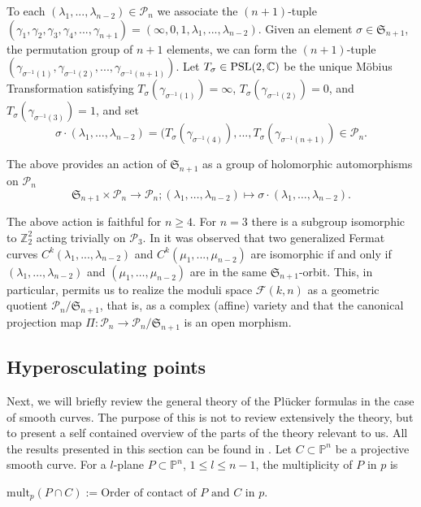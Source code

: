\documentclass{amsart}
\newcommand{\C}[3]{\ensuremath{C^{#1}(#3_1,...,#3_{#2})}}
\newcommand{\mult}[2]{\ensuremath{\mathrm{mult_{\mathit{p}}}(#1\cap #2)}}
\begin{document}
To each $(\lambda_1,...,\lambda_{n-2})\in \mathcal{P}_n$ we associate the $(n+1)$-tuple $(\gamma_1,\gamma_2,\gamma_3,\gamma_4,...,\gamma_{n+1})=(\infty, 0,1,\lambda_1,...,\lambda_{n-2})$. Given an element $\sigma \in \mathfrak{S}_{n+1}$, 
 the permutation group of $n+1$ elements, we can form the $(n+1)$-tuple  
  $(\gamma_{\sigma^{-1}(1)},\gamma_{\sigma^{-1}(2)},...,\gamma_{\sigma^{-1}(n+1)})$. 
Let  $T_{\sigma}\in {\rm PSL}(2,\mathbb{C})$  be the unique M\"obius Transformation satisfying $T_{\sigma}(\gamma_{\sigma^{-1}(1)})=\infty$, 
$T_{\sigma}(\gamma_{\sigma^{-1}(2)})=0$, and $T_{\sigma}(\gamma_{\sigma^{-1}(3)})=1$, and set
$$\sigma \cdot (\lambda_{1},\ldots, \lambda_{n-2})=(T_{\sigma} (\gamma_{\sigma^{-1}(4)}),...,T_{\sigma} (\gamma_{\sigma^{-1}(n+1)}) \in {\mathcal P}_{n}.$$

The above provides an action of ${\mathfrak S}_{n+1}$ as a group of holomorphic automorphisms on ${\mathcal P}_{n}$
$$
\mathfrak{S}_{n+1}\times \mathcal{P}_n\rightarrow  \mathcal{P}_n; (\lambda_{1},\ldots, \lambda_{n-2})\mapsto 
\sigma \cdot (\lambda_{1},\ldots, \lambda_{n-2}).
$$

The above action is faithful for $n \geq 4$. For $n=3$ there is a subgroup isomorphic to ${\mathbb Z}_{2}^{2}$ acting trivially on ${\mathcal P}_{3}$.
In \cite{GHL09} it was observed that two generalized Fermat curves $\C{k}{n-2}{\lambda}$ and $\C{k}{n-2}{\mu}$ are isomorphic if and only if $(\lambda_{1},\ldots,\lambda_{n-2})$ and $(\mu_{1},\ldots,\mu_{n-2})$ are in the same ${\mathfrak S}_{n+1}$-orbit. This, in particular, 
permits us to realize the moduli space $\mathcal{F}(k,n)$ as a geometric quotient 
$\mathcal{P}_n/\mathfrak{S}_{n+1}$, that is, as a  complex (affine) variety and that the canonical projection
map $\Pi:  \mathcal{P}_n\to  \mathcal{P}_n /{\mathfrak S}_{n+1}$ is an open morphism.




\subsection{Hyperosculating points}
Next, we will briefly review the general theory of the Pl\"ucker 
formulas in the case of smooth curves. The purpose of this is not to review extensively the theory,
but to present a self contained overview of the parts of the theory relevant to us. 
All the results presented in this section can be found in \cite{GrHa94}.
Let $C \subset {\mathbb{P}}^n$ be a projective smooth curve. For a $l$-plane
$P\subset {\mathbb{P}}^{n}$, $1\leq l\leq n-1$, the  multiplicity of $P$ in $p$ is
\begin{center}
$\mult{P}{C}:=\mbox{Order of contact of  $P$ and $C$ in $p$}$. 
\end{center}
\end{document}
